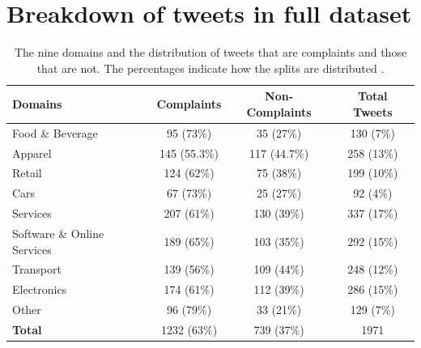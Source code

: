 \section{Breakdown of tweets in full dataset}
\begin{table}[ht]
    \captionsetup{font=small}
    \centering
    \begin{tabularx}{\textwidth}{|X|c|c|c|}
        \hline
        \rowcolor[gray]{0.7}
        \textbf{Domains}            & \textbf{Complaints} & \textbf{Non-Complaints} & \textbf{Total Tweets} \\
        \hline
        Food \& Beverage            & 95 \small{(73\%)}   & 35 \small{(27\%)}       & 130 \small{(7\%)}     \\
        \rowcolor[gray]{0.9}
        Apparel                     & 145 \small{(55.3\%)}  & 117 \small{(44.7\%)}      & 258 \small{(13\%)}    \\
        Retail                      & 124 \small{(62\%)}  & 75 \small{(38\%)}       & 199 \small{(10\%)}    \\
        \rowcolor[gray]{0.9}
        Cars                        & 67 \small{(73\%)}   & 25 \small{(27\%)}       & 92 \small{(4\%)}      \\
        Services                    & 207 \small{(61\%)}  & 130 \small{(39\%)}      & 337 \small{(17\%)}    \\
        \rowcolor[gray]{0.9}
        Software \& Online Services & 189 \small{(65\%)}  & 103 \small{(35\%)}      & 292 \small{(15\%)}    \\
        Transport                   & 139 \small{(56\%)}  & 109 \small{(44\%)}      & 248 \small{(12\%)}    \\
        \rowcolor[gray]{0.9}
        Electronics                 & 174 \small{(61\%)}  & 112 \small{(39\%)}      & 286 \small{(15\%)}    \\
        Other                       & 96 \small{(79\%)}   & 33 \small{(21\%)}       & 129 \small{(7\%)}     \\
        \hline
        \rowcolor[gray]{0.9}
        \textbf{Total}              & 1232 \small{(63\%)} & 739 \small{(37\%)}      & 1971                  \\
        \hline
    \end{tabularx}
    \caption{The nine domains and the distribution of tweets that are complaints and those that are not. The percentages indicate how the splits are distributed \cite{preotiuc-pietro_automatically_2019}.}
    \label{tab: domains}
\end{table}



